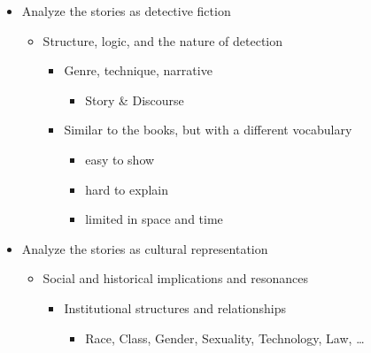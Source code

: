 \documentclass[a4paper,landscape,headrule,footrule,xetex]{foils}
\begin{document}
\begin{itemize}
\item Analyze the stories as detective fiction
  \begin{itemize}
  \item Structure, logic, and the nature of detection
    \begin{itemize}
    \item Genre, technique, narrative
      \begin{itemize}
      \item Story \& Discourse %
      \end{itemize}
    \item Similar to the books, but with a different vocabulary
      \begin{itemize}
      \item easy to show
      \item hard to explain
      \item limited in space and time
      \end{itemize}
    \end{itemize}
  \end{itemize}
\item Analyze the stories as cultural representation
  \begin{itemize}
  \item Social and historical implications and
    resonances
    \begin{itemize}
    \item Institutional structures and relationships
      \begin{itemize}
      \item Race, Class, Gender, Sexuality, Technology, Law, \ldots
      \end{itemize}
    \end{itemize}
  \end{itemize}
\end{itemize}
\end{document}

